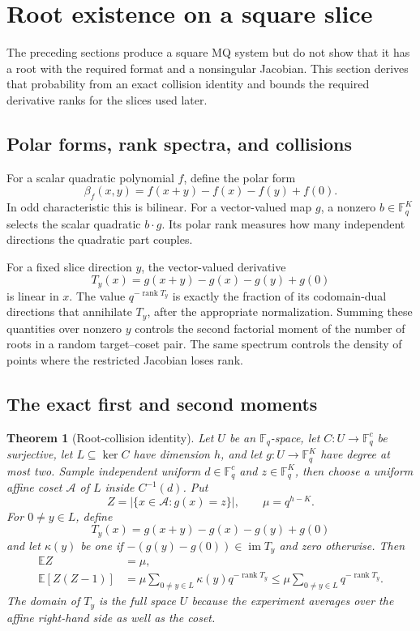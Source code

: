 \documentclass[11pt]{article}
\newtheorem{theorem}{Theorem}[section]
\newcommand{\F}{\mathbb F}
\newcommand{\rank}{\operatorname{rank}}
\newcommand{\im}{\operatorname{im}}
\begin{document}
\section{Root existence on a square slice}
\label{sec:sq-full-domain-spectrum}

The preceding sections produce a square MQ system but do not show that it has
a root with the required format and a nonsingular Jacobian.  This section
derives that probability from an exact collision identity and bounds the
required derivative ranks for the slices used later.

\subsection{Polar forms, rank spectra, and collisions}
For a scalar quadratic polynomial $f$, define the polar form
\[
  \beta_f(x,y)=f(x+y)-f(x)-f(y)+f(0).
\]
In odd characteristic this is bilinear.  For a vector-valued map $g$, a
nonzero $b\in\F_q^K$ selects the scalar quadratic $b\cdot g$.  Its polar rank
measures how many independent directions the quadratic part couples.

For a fixed slice direction $y$, the vector-valued derivative
\begin{equation}
  T_y(x)=g(x+y)-g(x)-g(y)+g(0)
  \label{eq:sq-Ty}
\end{equation}
is linear in $x$.  The value $q^{-\rank T_y}$ is exactly the fraction of its
codomain-dual directions that annihilate $T_y$, after the appropriate
normalization.  Summing these quantities over nonzero $y$ controls the second
factorial moment of the number of roots in a random target--coset pair.  The
same spectrum controls the density of points where the restricted Jacobian
loses rank.

\subsection{The exact first and second moments}

\begin{theorem}[Root-collision identity]\label{thm:collision-identity}
Let $U$ be an $\F_q$-space, let $C:U\to\F_q^c$ be surjective, let
$L\subseteq\ker C$ have dimension $h$, and let
$g:U\to\F_q^K$ have degree at most two.  Sample independent uniform
$d\in\F_q^c$ and $z\in\F_q^K$, then choose a uniform affine coset $\mathcal A$
of $L$ inside $C^{-1}(d)$.  Put
\[
 Z=|\{x\in\mathcal A:g(x)=z\}|,
 \qquad \mu=q^{h-K}.
\]
For $0\ne y\in L$, define
\[
 T_y(x)=g(x+y)-g(x)-g(y)+g(0)
\]
and let $\kappa(y)$ be one if
$-(g(y)-g(0))\in\im T_y$ and zero otherwise.  Then
\begin{align}
 \mathbb EZ&=\mu,                                      \label{eq:moment-first}\\
 \mathbb E[Z(Z-1)]
 &=\mu\sum_{0\ne y\in L}\kappa(y)q^{-\rank T_y}
 \le \mu\sum_{0\ne y\in L}q^{-\rank T_y}.          \label{eq:moment-second}
\end{align}
The domain of $T_y$ is the full space $U$ because the experiment averages over
the affine right-hand side as well as the coset.
\end{theorem}
\end{document}
